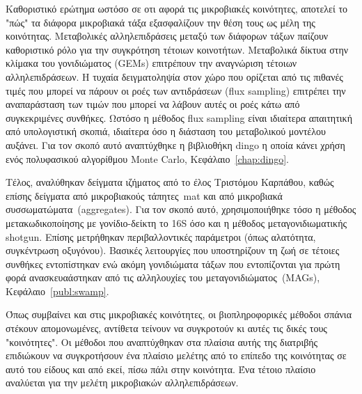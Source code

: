 \documentclass[master=elt, cleveref, autoref, masteroption=eg]{kulemt}
\begin{document}
\begin{abstract*}
   Καθοριστικό ερώτημα ωστόσο σε οτι αφορά τις μικροβιακές κοινότητες, αποτελεί το "πώς" τα διάφορα μικροβιακά τάξα 
   εξασφαλίζουν την θέση τους ως μέλη της κοινότητας. 
   Μεταβολικές αλληλεπιδράσεις μεταξύ των διάφορων τάξων παίζουν καθοριστικό ρόλο για την συγκρότηση 
   τέτοιων κοινοτήτων. 
   Μεταβολικά δίκτυα στην κλίμακα του γονιδιώματος (\foreignlanguage{english}{GEMs}) επιτρέπουν την 
   αναγνώριση τέτοιων αλληλεπιδράσεων. 
   Η τυχαία δειγματοληψία στον χώρο που ορίζεται από τις πιθανές τιμές που μπορεί να πάρουν οι ροές των αντιδράσεων (\foreignlanguage{english}{flux sampling})
   επιτρέπει την αναπαράσταση των τιμών που μπορεί να λάβουν αυτές οι ροές κάτω από συγκεκριμένες συνθήκες. 
   Ωστόσο η μέθοδος \foreignlanguage{english}{flux sampling} είναι ιδιαίτερα απαιτητική από υπολογιστική σκοπιά,
   ιδιαίτερα όσο η διάσταση του μεταβολικού μοντέλου αυξάνει.
   Για τον σκοπό αυτό αναπτύχθηκε η βιβλιοθήκη \foreignlanguage{english}{dingo} η οποία κάνει χρήση ενός 
   πολυφασικού αλγορίθμου \foreignlanguage{english}{Monte Carlo}, Κεφάλαιο~\foreignlanguage{english}{\ref{chap:dingo}}. 

   Τέλος, αναλύθηκαν δείγματα ιζήματος από το έλος Τριστόμου Καρπάθου, καθώς επίσης
   δείγματα από μικροβιακούς τάπητες~\foreignlanguage{english}{mat} και από μικροβιακά συσσωματώματα~(\foreignlanguage{english}{aggregates}).
   Για τον σκοπό αυτό, χρησιμοποιήθηκε τόσο η μέθοδος μετακωδικοποίησης με γονίδιο-δείκτη το 16\foreignlanguage{english}{S}
   όσο και η μέθοδος μεταγονιδιωματικής \foreignlanguage{english}{shotgun}.
   Επίσης μετρήθηκαν περιβαλλοντικές παράμετροι (όπως αλατότητα, συγκέντρωση οξυγόνου). 
   Βασικές λειτουργίες που υποστηρίζουν τη ζωή σε τέτοιες συνθήκες εντοπίστηκαν 
   ενώ ακόμη γονιδιώματα τάξων που εντοπίζονται για πρώτη φορά ανασκευαάστηκαν από τις αλληλουχίες του μεταγονιδιώματος~(\foreignlanguage{english}{MAGs}), Κεφάλαιο~\foreignlanguage{english}{\ref{publ:swamp}}.

   Όπως συμβαίνει και στις μικροβιακές κοινότητες, οι βιοπληροφορικές μέθοδοι σπάνια στέκουν 
   απομονωμένες, αντίθετα τείνουν να συγκροτούν κι αυτές τις δικές τους "κοινότητες". 
   Οι μέθοδοι που αναπτύχθηκαν στα πλαίσια αυτής της διατριβής επιδιώκουν να συγκροτήσουν ένα πλαίσιο μελέτης
   από το επίπεδο της κοινότητας σε αυτό του είδους και από εκεί, πίσω πάλι στην κοινότητα. 
   Ένα τέτοιο πλαίσιο αναλύεται για την μελέτη μικροβιακών αλληλεπιδράσεων. 



\end{abstract*}
\end{document}
